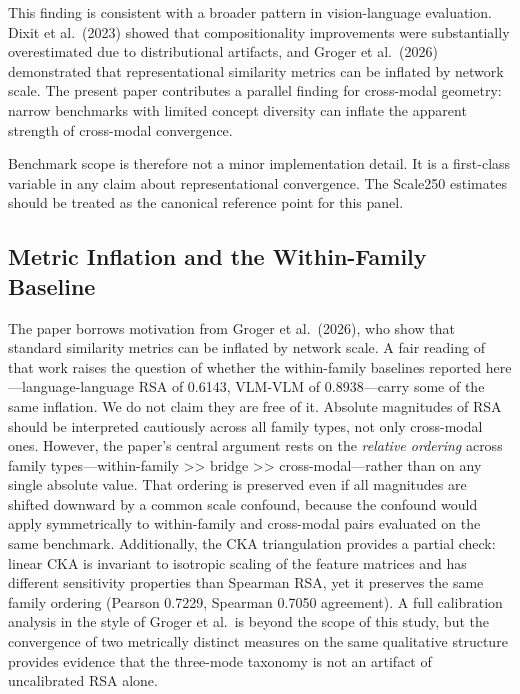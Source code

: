 \documentclass[10pt]{article}
\begin{document}
This finding is consistent with a broader pattern in vision-language
evaluation. Dixit et al.~(2023) showed that compositionality
improvements were substantially overestimated due to distributional
artifacts, and Groger et al.~(2026) demonstrated that representational
similarity metrics can be inflated by network scale. The present paper
contributes a parallel finding for cross-modal geometry: narrow
benchmarks with limited concept diversity can inflate the apparent
strength of cross-modal convergence.

Benchmark scope is therefore not a minor implementation detail. It is a
first-class variable in any claim about representational convergence.
The Scale250 estimates should be treated as the canonical reference
point for this panel.

\subsection{Metric Inflation and the Within-Family
Baseline}\label{metric-inflation-and-the-within-family-baseline}

The paper borrows motivation from Groger et al.~(2026), who show that
standard similarity metrics can be inflated by network scale. A fair
reading of that work raises the question of whether the within-family
baselines reported here---language-language RSA of 0.6143, VLM-VLM of
0.8938---carry some of the same inflation. We do not claim they are free
of it. Absolute magnitudes of RSA should be interpreted cautiously
across all family types, not only cross-modal ones. However, the paper's
central argument rests on the \emph{relative ordering} across family
types---within-family \textgreater\textgreater{} bridge
\textgreater\textgreater{} cross-modal---rather than on any single
absolute value. That ordering is preserved even if all magnitudes are
shifted downward by a common scale confound, because the confound would
apply symmetrically to within-family and cross-modal pairs evaluated on
the same benchmark. Additionally, the CKA triangulation provides a
partial check: linear CKA is invariant to isotropic scaling of the
feature matrices and has different sensitivity properties than Spearman
RSA, yet it preserves the same family ordering (Pearson 0.7229, Spearman
0.7050 agreement). A full calibration analysis in the style of Groger et
al.~is beyond the scope of this study, but the convergence of two
metrically distinct measures on the same qualitative structure provides
evidence that the three-mode taxonomy is not an artifact of uncalibrated
RSA alone.
\end{document}
